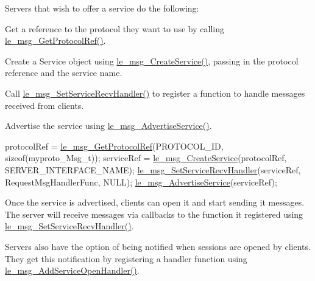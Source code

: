 Servers that wish to offer a service do the following\+:
\begin{DoxyEnumerate}
\item Get a reference to the protocol they want to use by calling \hyperlink{le__messaging_8h_adcd1ff1a6906433aaa6d7038125c4473}{le\+\_\+msg\+\_\+\+Get\+Protocol\+Ref()}.
\item Create a Service object using \hyperlink{le__messaging_8h_adbbb2737069b636028128c74ae407742}{le\+\_\+msg\+\_\+\+Create\+Service()}, passing in the protocol reference and the service name.
\item Call \hyperlink{le__messaging_8h_a21c2e57ad1ffbbdfedd3987c468e3130}{le\+\_\+msg\+\_\+\+Set\+Service\+Recv\+Handler()} to register a function to handle messages received from clients.
\item Advertise the service using \hyperlink{le__messaging_8h_ad3ff11d1962840f879d9c8fe7054de0c}{le\+\_\+msg\+\_\+\+Advertise\+Service()}.
\end{DoxyEnumerate}


\begin{DoxyCode}
protocolRef = \hyperlink{le__messaging_8h_adcd1ff1a6906433aaa6d7038125c4473}{le\_msg\_GetProtocolRef}(PROTOCOL\_ID, \textcolor{keyword}{sizeof}(myproto\_Msg\_t));
serviceRef = \hyperlink{le__messaging_8h_adbbb2737069b636028128c74ae407742}{le\_msg\_CreateService}(protocolRef, SERVER\_INTERFACE\_NAME);
\hyperlink{le__messaging_8h_a21c2e57ad1ffbbdfedd3987c468e3130}{le\_msg\_SetServiceRecvHandler}(serviceRef, RequestMsgHandlerFunc, NULL);
\hyperlink{le__messaging_8h_ad3ff11d1962840f879d9c8fe7054de0c}{le\_msg\_AdvertiseService}(serviceRef);
\end{DoxyCode}


Once the service is advertised, clients can open it and start sending it messages. The server will receive messages via callbacks to the function it registered using \hyperlink{le__messaging_8h_a21c2e57ad1ffbbdfedd3987c468e3130}{le\+\_\+msg\+\_\+\+Set\+Service\+Recv\+Handler()}.

Servers also have the option of being notified when sessions are opened by clients. They get this notification by registering a handler function using \hyperlink{le__messaging_8h_a829d6450d487166e0b2994b4bf44ee5d}{le\+\_\+msg\+\_\+\+Add\+Service\+Open\+Handler()}.


